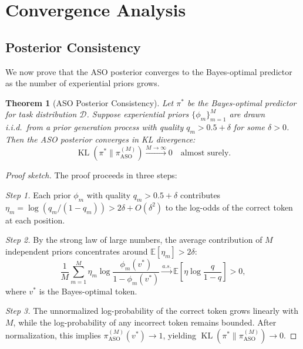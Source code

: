 \documentclass[11pt]{article}
\newtheorem{theorem}{Theorem}
\DeclareMathOperator{\KL}{KL}
\begin{document}
\section{Convergence Analysis}
\label{sec:convergence}

\subsection{Posterior Consistency}

We now prove that the ASO posterior converges to the Bayes-optimal predictor as
the number of experiential priors grows.

\begin{theorem}[ASO Posterior Consistency]
\label{thm:consistency}
Let $\pi^*$ be the Bayes-optimal predictor for task distribution $\mathcal{D}$.
Suppose experiential priors $\{\phi_m\}_{m=1}^M$ are drawn i.i.d.\ from a prior
generation process with quality $q_m > 0.5 + \delta$ for some $\delta > 0$.
Then the ASO posterior converges in KL divergence:
\begin{equation}
    \KL(\pi^* \| \pi_{\text{ASO}}^{(M)}) \xrightarrow{M \to \infty} 0
    \quad \text{almost surely}.
\end{equation}
\end{theorem}

\begin{proof}[Proof sketch]
The proof proceeds in three steps:

\textit{Step 1.} Each prior $\phi_m$ with quality $q_m > 0.5 + \delta$
contributes $\eta_m = \log(q_m / (1-q_m)) > 2\delta + O(\delta^2)$ to the
log-odds of the correct token at each position.

\textit{Step 2.} By the strong law of large numbers, the average contribution
of $M$ independent priors concentrates around $\mathbb{E}[\eta_m] > 2\delta$:
\begin{equation}
    \frac{1}{M} \sum_{m=1}^M \eta_m \log \frac{\phi_m(v^*)}{1 - \phi_m(v^*)}
    \xrightarrow{a.s.} \mathbb{E}\left[\eta \log \frac{q}{1-q}\right] > 0,
\end{equation}
where $v^*$ is the Bayes-optimal token.

\textit{Step 3.} The unnormalized log-probability of the correct token grows
linearly with $M$, while the log-probability of any incorrect token remains
bounded. After normalization, this implies $\pi_{\text{ASO}}^{(M)}(v^*) \to 1$,
yielding $\KL(\pi^* \| \pi_{\text{ASO}}^{(M)}) \to 0$.
\end{proof}
\end{document}
